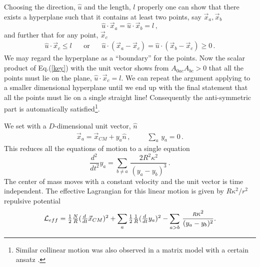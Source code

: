 \documentclass[a4paper,12pt]{article}
\def\L{{\cal L}}
\def\half{{\textstyle{\frac{1}{2}}}}
\begin{document}
Choosing the direction, $\hat{u}$ and the length, $l$ properly one can show that there exists a hyperplane such that it contains at least two points, say $\vec{x}_{a},\vec{x}_{b}$ 
\begin{equation}
\hat{u}\cdot\vec{x}_{a}=\hat{u}\cdot\vec{x}_{b}=l\,,
\end{equation}
and further that for any point, $\vec{x}_{c}$
\begin{equation}
\begin{array}{ccc}
\hat{u}\cdot\vec{x}_{c}\leq l~~&~~\mbox{or}~~&~~\hat{u}\cdot(\vec{x}_{a}-\vec{x}_{c})=\hat{u}\cdot(\vec{x}_{b}-\vec{x}_{c})\geq 0\,.
\end{array}
\end{equation}
We may regard the hyperplane as a ``boundary'' for the points. Now the scalar product of Eq.(\ref{key}) with the unit vector shows from $A_{0ac}A_{bc}>0$ that  all the points must lie on the plane, $\hat{u}\cdot\vec{x}_{c}=l$. We can repeat the argument applying to a smaller dimensional hyperplane until  we end up with the final statement  that  all the points  must lie  on a single straight line! Consequently  the  anti-symmetric part is automatically satisfied\footnote{Similar collinear motion was also observed  in a matrix model with a certain ansatz \cite{9705047}.}. \newline


We set with a $D$-dimensional unit vector, $\hat{n}$
\begin{equation}
\begin{array}{cc}
\vec{x}_{a}=\vec{x}_{CM}+y_{a}\hat{n}\,,~~~~&~~~\displaystyle{\sum_{a}}\,y_{a}=0\,.
\end{array}
\end{equation}
This reduces all the equations of motion to a single equation
\begin{equation}
\textstyle{\frac{d^{2}\,}{dt^{2}}}y_{a}=\displaystyle{\sum_{b\neq
a}\,\frac{2{\scriptstyle{R}}^{2}\kappa^{2}}{(y_{a}-y_{b})^{3}}}\,.
\end{equation}
The center of mass moves with a constant velocity and  the unit vector is time independent. The effective
Lagrangian for this linear motion is given by ${\scriptstyle R}\kappa^{2}/r^2$ repulsive potential
\begin{equation}
\L_{eff} =\textstyle{\half\frac{N}{R}}(\textstyle{\frac{d\,}{dt}}\vec{x}_{CM})^{2}
+\displaystyle{\sum_{a}\,}\half\textstyle{\frac{1}{R}}(\textstyle{\frac{d\,}{dt}}y_{a})^{2}-
\displaystyle{\sum_{a>b}\,\frac{{\scriptstyle{R}}\kappa^{2}}{(y_{a}-y_{b})^{2}}}.
\end{equation}
\end{document}
